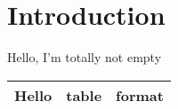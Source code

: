 \documentclass{article}
\begin{document}
\section{Introduction}
\label{sec:intro}Hello, I'm totally not empty

\begin{table}
\begin{tabular}{l l l}
  Hello & table & format \\
  \hline
\end{tabular}
\end{table}
\end{document}
